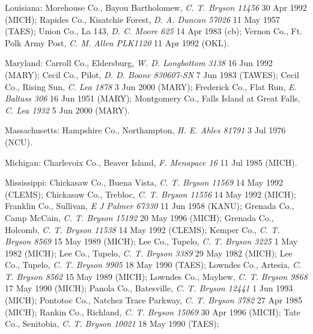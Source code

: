 \documentclass{article}
\begin{document}
Louisiana:
Morehouse Co., Bayou Bartholomew, \textit{C. T. Bryson 11456} 30 Apr 1992 (MICH); 
Rapides Co., Kisatchie Forest, \textit{D. A. Duncan 57026} 11 May 1957 (TAES); 
Union Co., La 143, \textit{D. C. Moore 625} 14 Apr 1983 (cb); 
Vernon Co., Ft. Polk Army Post, \textit{C. M. Allen PLK1120} 11 Apr 1992 (OKL). 

Maryland:
Carroll Co., Eldersburg, \textit{W. D. Longbottom 3138} 16 Jun 1992 (MARY); 
Cecil Co., Pilot, \textit{D. D. Boone 830607-SN} 7 Jun 1983 (TAWES); 
Cecil Co., Rising Sun, \textit{C. Lea 1878} 3 Jun 2000 (MARY); 
Frederick Co., Flat Run, \textit{E. Baltass 306} 16 Jun 1951 (MARY); 
Montgomery Co., Falls Island at Great Falls, \textit{C. Lea 1932} 5 Jun 2000 (MARY). 

Massachusetts:
Hampshire Co., Northampton, \textit{H. E. Ahles 81791} 3 Jul 1976 (NCU). 

Michigan:
Charlevoix Co., Beaver Island, \textit{F. Menapace 16} 11 Jul 1985 (MICH). 

Mississippi:
Chickasaw Co., Buena Vista, \textit{C. T. Bryson 11569} 14 May 1992 (CLEMS); 
Chickasaw Co., Trebloc, \textit{C. T. Bryson 11556} 14 May 1992 (MICH); 
Franklin Co., Sullivan, \textit{E J Palmer 67330} 11 Jun 1958 (KANU); 
Grenada Co., Camp McCain, \textit{C. T. Bryson 15192} 20 May 1996 (MICH); 
Grenada Co., Holcomb, \textit{C. T. Bryson 11538} 14 May 1992 (CLEMS); 
Kemper Co., \textit{C. T. Bryson 8569} 15 May 1989 (MICH); 
Lee Co., Tupelo, \textit{C. T. Bryson 3225} 1 May 1982 (MICH); 
Lee Co., Tupelo, \textit{C. T. Bryson 3389} 29 May 1982 (MICH); 
Lee Co., Tupelo, \textit{C. T. Bryson 9905} 18 May 1990 (TAES); 
Lowndes Co., Artesia, \textit{C. T. Bryson 8562} 15 May 1989 (MICH); 
Lowndes Co., Mayhew, \textit{C. T. Bryson 9868} 17 May 1990 (MICH); 
Panola Co., Batesville, \textit{C. T. Bryson 12441} 1 Jun 1993 (MICH); 
Pontotoc Co., Natchez Trace Parkway, \textit{C. T. Bryson 3782} 27 Apr 1985 (MICH); 
Rankin Co., Richland, \textit{C. T. Bryson 15069} 30 Apr 1996 (MICH); 
Tate Co., Senitobia, \textit{C. T. Bryson 10021} 18 May 1990 (TAES); 
\end{document}
